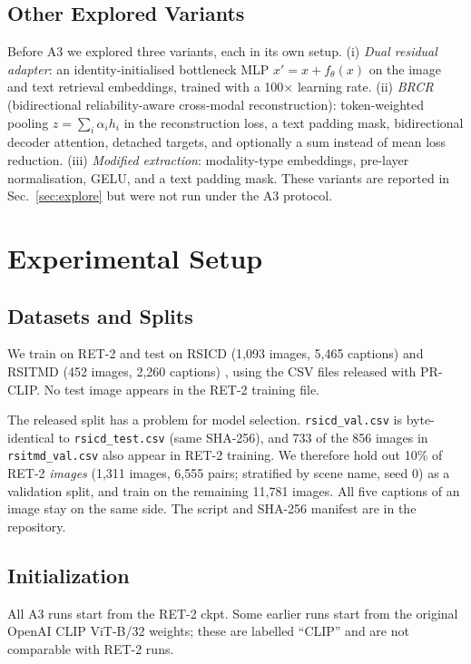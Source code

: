 \documentclass[conference]{IEEEtran}
\begin{document}
\subsection{Other Explored Variants}
Before A3 we explored three variants, each in its own setup. (i) \emph{Dual residual adapter}: an identity-initialised bottleneck MLP $x' = x + f_\theta(x)$ on the image and text retrieval embeddings, trained with a 100$\times$ learning rate. (ii) \emph{BRCR} (bidirectional reliability-aware cross-modal reconstruction): token-weighted pooling $z=\sum_i \alpha_i h_i$ in the reconstruction loss, a text padding mask, bidirectional decoder attention, detached targets, and optionally a sum instead of mean loss reduction. (iii) \emph{Modified extraction}: modality-type embeddings, pre-layer normalisation, GELU, and a text padding mask. These variants are reported in Sec.~\ref{sec:explore} but were not run under the A3 protocol.

\section{Experimental Setup}
\label{sec:setup}

\subsection{Datasets and Splits}
We train on RET-2 and test on RSICD (1{,}093 images, 5{,}465 captions) \cite{lu2018rsicd} and RSITMD (452 images, 2{,}260 captions) \cite{yuan2022amfmn}, using the CSV files released with PR-CLIP. No test image appears in the RET-2 training file.

The released split has a problem for model selection. \texttt{rsicd\_val.csv} is byte-identical to \texttt{rsicd\_test.csv} (same SHA-256), and 733 of the 856 images in \texttt{rsitmd\_val.csv} also appear in RET-2 training. We therefore hold out 10\% of RET-2 \emph{images} (1{,}311 images, 6{,}555 pairs; stratified by scene name, seed 0) as a validation split, and train on the remaining 11{,}781 images. All five captions of an image stay on the same side. The script and SHA-256 manifest are in the repository.

\subsection{Initialization}
All A3 runs start from the RET-2 ckpt. Some earlier runs start from the original OpenAI CLIP ViT-B/32 weights; these are labelled ``CLIP'' and are not comparable with RET-2 runs.
\end{document}
